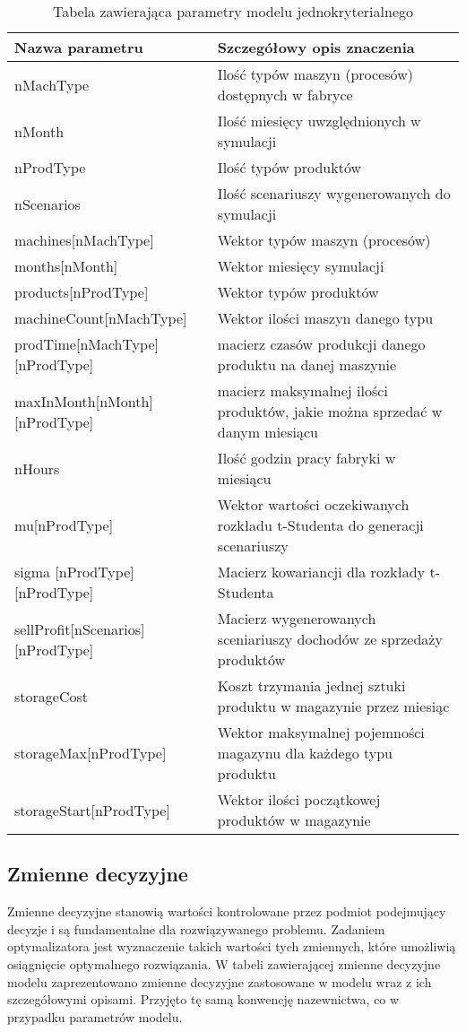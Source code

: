 \documentclass[11pt,a4paper]{article}
\begin{document}
\begin{table}[ht!]
\caption{Tabela zawierająca parametry modelu jednokryterialnego}
\label{tab:param}
\begin{tabular}{lp{9cm}}
    \hline
    Nazwa parametru      & Szczegółowy opis znaczenia \\
    \hline
    nMachType & Ilość typów maszyn (procesów) dostępnych w fabryce \\
nMonth & Ilość miesięcy uwzględnionych w symulacji  \\
nProdType & Ilość typów produktów \\
nScenarios & Ilość scenariuszy wygenerowanych do symulacji \\
machines[nMachType] & Wektor typów maszyn (procesów)\\
months[nMonth] & Wektor miesięcy symulacji\\
products[nProdType] & Wektor typów produktów\\
machineCount[nMachType] & Wektor ilości maszyn danego typu\\
prodTime[nMachType][nProdType] & macierz czasów produkcji danego produktu na danej maszynie \\
maxInMonth[nMonth][nProdType] & macierz maksymalnej ilości produktów, jakie można sprzedać w danym miesiącu\\
nHours & Ilość godzin pracy fabryki w miesiącu\\
mu[nProdType] & Wektor wartości oczekiwanych rozkładu t-Studenta do generacji scenariuszy\\
sigma [nProdType][nProdType] & Macierz kowariancji dla rozkłady t-Studenta\\ 
sellProfit[nScenarios][nProdType] & Macierz wygenerowanych sceniariuszy dochodów ze sprzedaży produktów\\
storageCost & Koszt trzymania jednej sztuki produktu w magazynie przez miesiąc \\
storageMax[nProdType] & Wektor maksymalnej pojemności magazynu dla każdego typu produktu \\
storageStart[nProdType] & Wektor ilości początkowej produktów w magazynie \\
    \hline
\end{tabular}
\end{table}

\subsection{Zmienne decyzyjne}
Zmienne decyzyjne stanowią wartości kontrolowane przez podmiot podejmujący decyzje i są fundamentalne dla rozwiązywanego problemu. Zadaniem optymalizatora jest wyznaczenie takich wartości tych zmiennych, które umożliwią osiągnięcie optymalnego rozwiązania. W tabeli zawierającej zmienne decyzyjne modelu zaprezentowano zmienne decyzyjne zastosowane w modelu wraz z ich szczegółowymi opisami. Przyjęto tę samą konwencję nazewnictwa, co w przypadku parametrów modelu.
\end{document}
